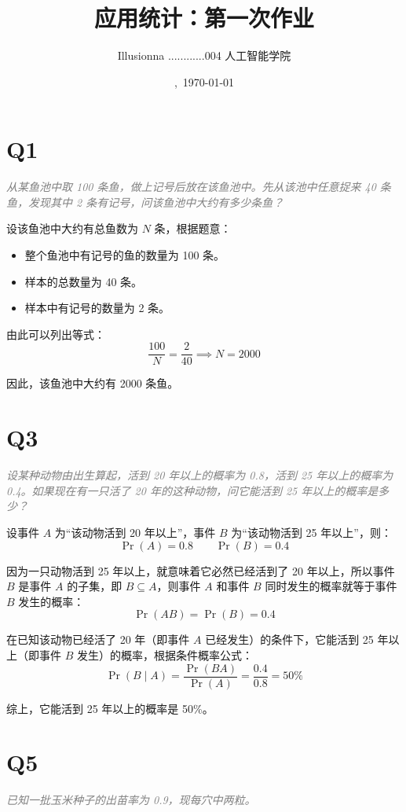 \documentclass{article}
\title{应用统计：第一次作业}
\author{Illusionna \quad 2025............004 \quad 人工智能学院}
\date{\currenttime,\ \today}
\begin{document}
\maketitle



\section{Q1}
\textit{\textcolor{gray}{从某鱼池中取 100 条鱼，做上记号后放在该鱼池中。先从该池中任意捉来 40 条鱼，发现其中 2 条有记号，问该鱼池中大约有多少条鱼？}}

设该鱼池中大约有总鱼数为 $N$ 条，根据题意：

\begin{itemize}
    \item 整个鱼池中有记号的鱼的数量为 100 条。
    \item 样本的总数量为 40 条。
    \item 样本中有记号的数量为 2 条。
\end{itemize}

由此可以列出等式：
\[ \dfrac{100}{N}=\dfrac{2}{40}\implies N=2000 \]

因此，该鱼池中大约有 2000 条鱼。



\section{Q3}
\textit{\textcolor{gray}{设某种动物由出生算起，活到 20 年以上的概率为 0.8，活到 25 年以上的概率为 0.4。如果现在有一只活了 20 年的这种动物，问它能活到 25 年以上的概率是多少？}}

设事件 $A$ 为“该动物活到 20 年以上”，事件 $B$ 为“该动物活到 25 年以上”，则：
\[ \Pr(A)=0.8\qquad \Pr(B)=0.4 \]

因为一只动物活到 25 年以上，就意味着它必然已经活到了 20 年以上，所以事件 $B$ 是事件 $A$ 的子集，即 $B\subseteq A$，则事件 $A$ 和事件 $B$ 同时发生的概率就等于事件 $B$ 发生的概率：
\[ \Pr(AB)=\Pr(B)=0.4 \]

在已知该动物已经活了 20 年（即事件 $A$ 已经发生）的条件下，它能活到 25 年以上（即事件 $B$ 发生）的概率，根据条件概率公式：
\[ \Pr(B\mid A)=\dfrac{\Pr(BA)}{\Pr(A)}=\dfrac{0.4}{0.8}=50\% \]

综上，它能活到 25 年以上的概率是 50\%。



\section{Q5}
\textit{\textcolor{gray}{已知一批玉米种子的出苗率为 0.9，现每穴中两粒。}}
\end{document}

